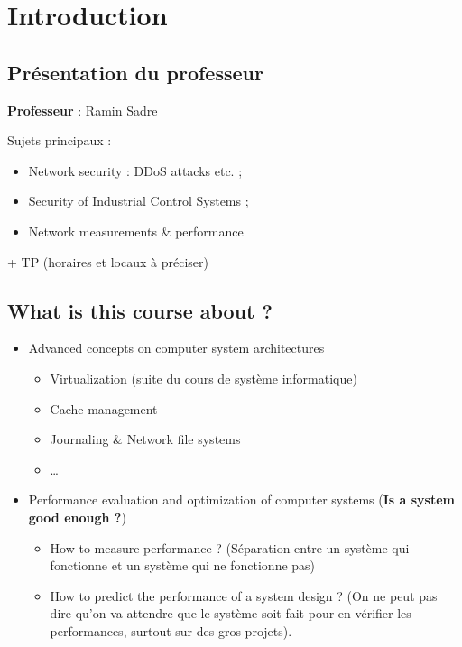 \section{Introduction}

\subsection{Présentation du professeur}

\textbf{Professeur} : Ramin Sadre 

Sujets principaux : 

\begin{itemize}
    \item Network security : DDoS attacks etc. ;
    \item Security of Industrial Control Systems ;
    \item Network measurements \& performance
\end{itemize}

+ TP (horaires et locaux à préciser)

\subsection{What is this course about ?}

\begin{itemize}
    \item Advanced concepts on computer system architectures
        \begin{itemize}
            \item Virtualization (suite du cours de système
                informatique)
            \item Cache management
            \item Journaling \& Network file systems
            \item \ldots
        \end{itemize}
    \item Performance evaluation and optimization of computer systems
        (\textbf{Is a system good enough ?})
        \begin{itemize}
            \item How to measure performance ? (Séparation entre un
                système qui fonctionne et un système qui ne fonctionne
                pas)
            \item How to predict the performance of a system design ?
                (On ne peut pas dire qu'on va attendre que le système
                soit fait pour en vérifier les performances, surtout sur
                des gros projets).
        \end{itemize}
\end{itemize}

